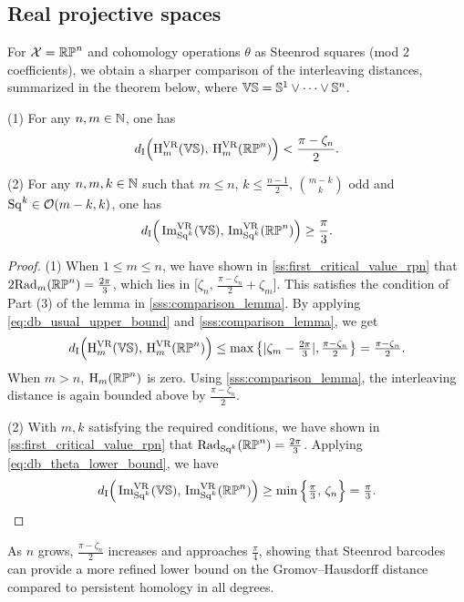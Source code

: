 \subsection{Real projective spaces}\label{ss:distance_estimate_rpn}

For \(\mathcal{X} = \mathbb{RP}^n\) and cohomology operations \(\theta\) as Steenrod squares (mod 2 coefficients), we obtain a sharper comparison of the interleaving distances, summarized in the theorem below, where \(\mathbb{VS} = \mathbb{S}^1 \vee \dots \vee \mathbb{S}^n\).

\medskip\theorem
(1) For any \(n,m \in \mathbb{N}\), one has
\[
d_{\mathrm{I}}\Big(\mathrm{H}^{\mathrm{VR}}_m(\mathbb{VS}),\, \mathrm{H}^{\mathrm{VR}}_m(\mathbb{RP}^n)\Big) < \frac{\pi-\zeta_n}{2}.
\]

(2) For any \(n,m,k \in \mathbb{N}\) such that $m \leq n,\, k \leq \tfrac{n-1}{2},\, \binom{m-k}{k}$ odd and $\mathrm{Sq}^k\in \mathcal{O}(m-k, k)$, one has
\[
d_{\mathrm{I}}\Big(\operatorname{Im}_{\mathrm{Sq}^k}^{\mathrm{VR}}(\mathbb{VS}),\, \operatorname{Im}_{\mathrm{Sq}^k}^{\mathrm{VR}}(\mathbb{RP}^n)\Big) \geq \frac{\pi}{3}.
\]

\begin{proof}
    (1) %
    When $1 \leq m \leq n$, we have shown in \cref{ss:first_critical_value_rpn} that
    $2\mathrm{Rad}_{m}(\mathbb{RP}^n) = \tfrac{2\pi}{3}$, which lies in $\big[\zeta_n,\, \tfrac{\pi - \zeta_n}{2}+\zeta_m\big]$.
    This satisfies the condition of Part (3) of the lemma in \cref{sss:comparison_lemma}.
	By applying \cref{eq:db_usual_upper_bound} and \cref{sss:comparison_lemma}, we get
	\[d_{\mathrm{I}}\Big(\mathrm{H}^{\mathrm{VR}}_m(\mathbb{VS}),\, \mathrm{H}^{\mathrm{VR}}_m(\mathbb{RP}^n)\Big)
    \leq
    \max \big\{ |\zeta_m  - \tfrac{2\pi}{3} |, \tfrac{\pi - \zeta_n}{2} \big\}
    = \tfrac{\pi - \zeta_n}{2}.\]
    When $m > n$, $\mathrm{H}_m(\mathbb{RP}^n)$ is zero.
    Using \cref{sss:comparison_lemma}, the interleaving distance is again bounded above by $\tfrac{\pi - \zeta_n}{2}$.

    (2) With $m,k$ satisfying the required conditions, we have shown in \cref{ss:first_critical_value_rpn} that
	$\mathrm{Rad}_{\mathrm{Sq}^k}(\mathbb{RP}^n) = \tfrac{2\pi}{3}$.
    Applying \cref{eq:db_theta_lower_bound}, we have
	\[d_{\mathrm{I}}\Big(\operatorname{Im}_{\mathrm{Sq}^k}^{\mathrm{VR}}(\mathbb{VS}),\, \operatorname{Im}_{\mathrm{Sq}^k}^{\mathrm{VR}}(\mathbb{RP}^n)\Big)
	\geq \min\Big\{\tfrac{\pi}{3},\, \zeta_n\Big\}
	= \tfrac{\pi}{3}.\qedhere
    \]
\end{proof}

As \(n\) grows, \(\tfrac{\pi - \zeta_n}{2}\) increases and approaches \(\tfrac{\pi}{4}\), showing that Steenrod barcodes can provide a more refined lower bound on the Gromov--Hausdorff distance compared to persistent homology in all degrees.